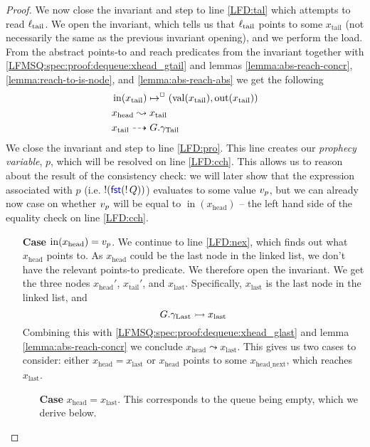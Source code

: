 \documentclass[a4paper, 10pt]{report}
\theoremstyle{definition}
\newcommand{\locN}[1]{\loc_{\mathrm{#1}}}
\newcommand{\loctail}{\locN{tail}}
\newcommand{\nIn}[1]{\operatorname{in}(#1)}
\newcommand{\nVal}[1]{\operatorname{val}(#1)}
\newcommand{\nOut}[1]{\operatorname{out}(#1)}
\newcommand{\node}{x}
\newcommand{\nodeN}[1]{\node_{\mathrm{#1}}}
\newcommand{\nodehead}{\nodeN{head}}
\newcommand{\nodetail}{\nodeN{tail}}
\newcommand{\nodelast}{\nodeN{last}}
\newcommand{\nodeheadnext}{\nodeN{head\_next}}
\newcommand{\prophval}{\val_p}
\newcommand{\Qg}{G}
\newcommand{\gtail}{\gname_{\mathrm{Tail}}}
\newcommand{\glast}{\gname_{\mathrm{Last}}}
\newcommand{\isNode}[1]{\nIn{#1} \mapsto^{\persistently} (\nVal{#1}, \nOut{#1})}
\newcommand{\reach}[2]{#1 \leadsto #2}
\newcommand{\ar}[2]{#1 \dashrightarrow #2}
\newcommand{\ap}[2]{#1 \rightarrowtail #2}
\begin{document}
\begin{proof}
  We now close the invariant and step to line \ref{LFD:tal} which attempts to read $\loctail$. We open the invariant, which tells us that $\loctail$ points to some $\nodetail$ (not necessarily the same as the previous invariant opening), and we perform the load. From the abstract points-to and reach predicates from the invariant together with \ref{LFMSQ:spec:proof:dequeue:xhead_gtail} and lemmas \ref{lemma:abs-reach-concr}, \ref{lemma:reach-to-is-node}, and \ref{lemma:abs-reach-abs} we get the following
  \begin{align}
    &\isNode{\nodetail}\label{LFMSQ:spec:proof:dequeue:xtail_node}\\
    &\reach{\nodehead}{\nodetail}\label{LFMSQ:spec:proof:dequeue:xhead_r_xtail}\\
    &\ar{\nodetail}{\Qg.\gtail}\label{LFMSQ:spec:proof:dequeue:xtail_gtail}\\
  \end{align}
  We close the invariant and step to line \ref{LFD:pro}. This line creates our \textit{prophecy variable}, $p$, which will be resolved on line \ref{LFD:cch}. This allows us to reason about the result of the consistency check: we will later show that the expression associated with $p$ (i.e. $\mathop{!}(\operatorname{\textsf{\color{blue} fst}} (\mathop{!} Q))$) evaluates to some value $\prophval$, but we can already now case on whether $\prophval$ will be equal to $\nIn{\nodehead}$ -- the left hand side of the equality check on line \ref{LFD:cch}.
  \begin{itemize}
    \item[\textbf{Case}] $\nIn{\nodehead} = \prophval$.
    We continue to line \ref{LFD:nex}, which finds out what $\nodehead$ points to. As $\nodehead$ could be the last node in the linked list, we don't have the relevant points-to predicate. We therefore open the invariant. We get the three nodes $\nodehead'$, $\nodetail'$, and $\nodelast$. Specifically, $\nodelast$ is the last node in the linked list, and 
    \begin{equation}\label{LFMSQ:spec:proof:dequeue:glast_xlast}
      \ap{\Qg.\glast}{\nodelast}
    \end{equation}
    Combining this with \ref{LFMSQ:spec:proof:dequeue:xhead_glast} and lemma \ref{lemma:abs-reach-concr} we conclude $\reach{\nodehead}{\nodelast}$. This gives us two cases to consider: either $\nodehead = \nodelast$ or $\nodehead$ points to some $\nodeheadnext$, which reaches $\nodelast$.
    \begin{itemize}
      \item[\textbf{Case}] $\nodehead = \nodelast$. This corresponds to the queue being empty, which we derive below.\\

\end{itemize}
\end{itemize}
\end{proof}
\end{document}
